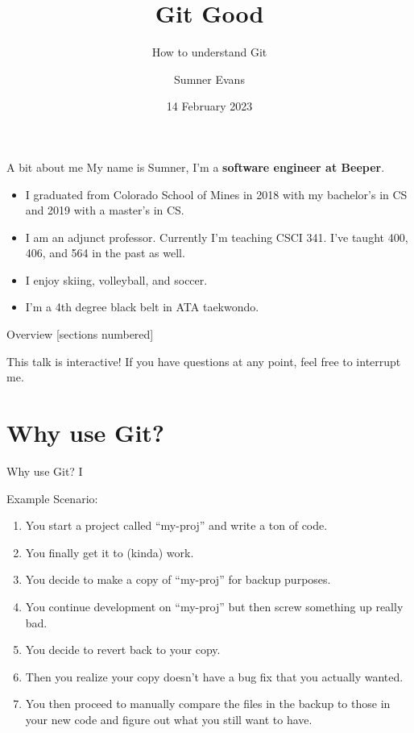 \documentclass{beeper}
\title{Git Good}
\subtitle{How to understand Git}
\author{Sumner Evans}
\institute{Mines ACM}
\date{14 February 2023}
\begin{document}
\begin{frame}{A bit about me}
    My name is Sumner, I'm a \textbf{software engineer at Beeper}.
    \begin{itemize}
        \item I graduated from Colorado School of Mines in 2018 with my
            bachelor's in CS and 2019 with a master's in CS.
        \item I am an adjunct professor. Currently I'm teaching CSCI 341. I've
            taught 400, 406, and 564 in the past as well.
        \item I enjoy skiing, volleyball, and soccer.
        \item I'm a 4th degree black belt in ATA taekwondo.
    \end{itemize}
\end{frame}

\begin{frame}{Overview}
    [sections numbered]
    \tableofcontents[hideallsubsections]

    \begin{block}{This talk is interactive!}
        If you have questions at any point, feel free to interrupt me.
    \end{block}
\end{frame}

\section{Why use Git?}

\begin{frame}{Why use Git? I}

    Example Scenario:

    \begin{enumerate}[<+->]
        \item You start a project called ``my-proj'' and write a ton of code.
        \item You finally get it to (kinda) work.
        \item You decide to make a copy of ``my-proj'' for backup purposes.
        \item You continue development on ``my-proj'' but then screw something
            up really bad.
        \item You decide to revert back to your copy.
        \item Then you realize your copy doesn't have a bug fix that you
            actually wanted.
        \item You then proceed to manually compare the files in the backup to
            those in your new code and figure out what you still want to have.
    \end{enumerate}

\end{frame}
\end{document}
